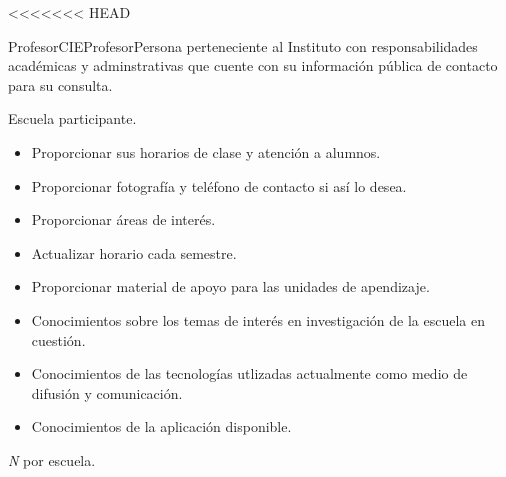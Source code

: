 <<<<<<< HEAD
\begin{actor}{Profesor}{CIEProfesor}{Persona perteneciente al Instituto con responsabilidades académicas y adminstrativas que cuente con su información pública de contacto para su consulta.}
	
	\item[Área:] Escuela participante.
	\item[Responsabilidades:] \hspace{1pt}
	
	\begin{itemize}
		
		\item Proporcionar sus horarios de clase y atención a alumnos.
		\item Proporcionar fotografía y teléfono de contacto si así lo desea.
		\item Proporcionar áreas de interés.
		\item Actualizar horario cada semestre.
		\item Proporcionar material de apoyo para las unidades de apendizaje.
		
	\end{itemize}
	
	\item[Perfil:] \hspace{1pt}
	
	\begin{itemize}
		
		\item Conocimientos sobre los temas de interés en investigación de la escuela en cuestión.
		\item Conocimientos de las tecnologías utlizadas actualmente como medio de difusión y comunicación.
		\item Conocimientos de la aplicación disponible.
		
	\end{itemize}
	
	\item[Cantidad:] \textit{N} por escuela.
	
\end{actor}

